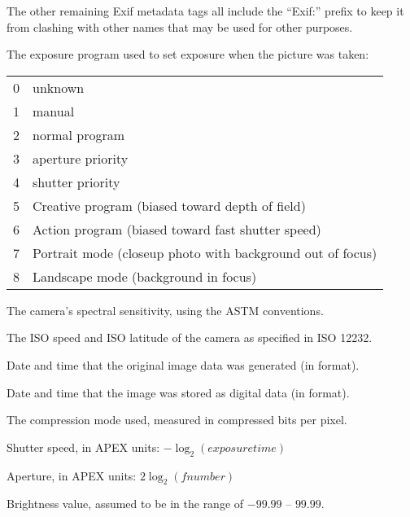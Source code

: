 \medskip

The other remaining Exif metadata tags all include the ``Exif:'' prefix
to keep it from clashing with other names that may be used for other
purposes.

The exposure program used to set exposure when the picture was taken:
\smallskip

\begin{tabular}{p{0.3in} p{4in}}
0 & unknown \\
1 & manual \\
2 & normal program \\
3 & aperture priority \\
4 & shutter priority \\
5 & Creative program (biased toward depth of field) \\
6 & Action program (biased toward fast shutter speed) \\
7 & Portrait mode (closeup photo with background out of focus) \\
8 & Landscape mode (background in focus)
\end{tabular}
\apiend

The camera's spectral sensitivity, using the ASTM conventions.
\apiend

The ISO speed and ISO latitude of the camera as specified in ISO 12232.
\apiend


Date and time that the original image data was generated (in
 format).
\apiend

Date and time that the image was stored as digital data (in
 format).
\apiend

The compression mode used, measured in compressed bits per pixel.
\apiend

Shutter speed, in APEX units: $-\log_2 (\mathit{exposure time})$
\apiend

Aperture, in APEX units: $2 \log_2 (\mathit{fnumber})$
\apiend

Brightness value, assumed to be in the range of $-99.99$ -- $99.99$.
\apiend

